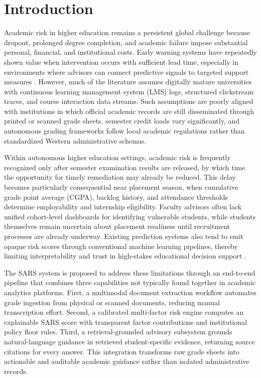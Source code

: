 \documentclass[conference]{IEEEtran}
\begin{document}
\section{Introduction}
Academic risk in higher education remains a persistent global challenge because dropout, prolonged degree completion, and academic failure impose substantial personal, financial, and institutional costs. Early warning systems have repeatedly shown value when intervention occurs with sufficient lead time, especially in environments where advisors can connect predictive signals to targeted support measures \cite{baker2014edm,essa2012predictive,arnold2012course}. However, much of the literature assumes digitally mature universities with continuous learning management system (LMS) logs, structured clickstream traces, and course interaction data streams. Such assumptions are poorly aligned with institutions in which official academic records are still disseminated through printed or scanned grade sheets, semester credit loads vary significantly, and autonomous grading frameworks follow local academic regulations rather than standardized Western administrative schemas.

Within autonomous higher education settings, academic risk is frequently recognized only after semester examination results are released, by which time the opportunity for timely remediation may already be reduced. This delay becomes particularly consequential near placement season, when cumulative grade point average (CGPA), backlog history, and attendance thresholds determine employability and internship eligibility. Faculty advisors often lack unified cohort-level dashboards for identifying vulnerable students, while students themselves remain uncertain about placement readiness until recruitment processes are already underway. Existing prediction systems also tend to emit opaque risk scores through conventional machine learning pipelines, thereby limiting interpretability and trust in high-stakes educational decision support \cite{jayaprakash2014early,romero2020survey,khosravi2022xai}.

The SARS system is proposed to address these limitations through an end-to-end pipeline that combines three capabilities not typically found together in academic analytics platforms. First, a multimodal document extraction workflow automates grade ingestion from physical or scanned documents, reducing manual transcription effort. Second, a calibrated multi-factor risk engine computes an explainable SARS score with transparent factor contributions and institutional policy floor rules. Third, a retrieval-grounded advisory subsystem grounds natural-language guidance in retrieved student-specific evidence, returning source citations for every answer. This integration transforms raw grade sheets into actionable and auditable academic guidance rather than isolated administrative records.
\end{document}
